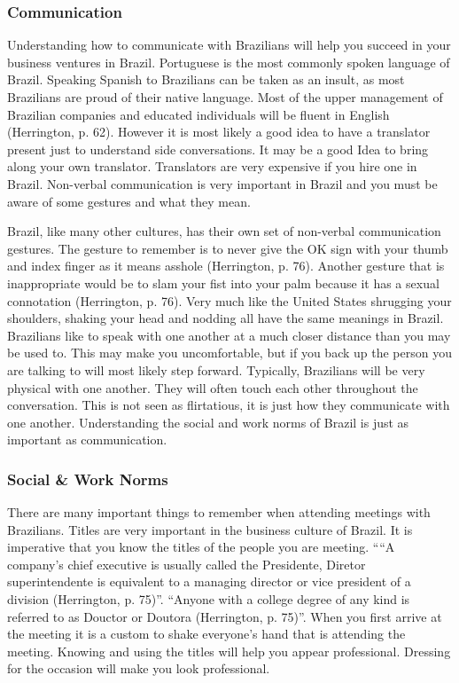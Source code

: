\documentclass[11pt,a4paper,oneside]{report}
\begin{document}
\subsubsection{Communication}\label{third}
Understanding how to communicate with Brazilians will help you succeed in
your business ventures in Brazil. Portuguese is the most commonly spoken
language of Brazil. Speaking Spanish to Brazilians can be taken as an
insult, as most Brazilians are proud of their native language.  Most of the
upper management of Brazilian companies and educated individuals will be
fluent in English (Herrington, p. 62). However it is most likely a good
idea to have a translator present just to understand side conversations. It
may be a good Idea to bring along your own translator. Translators are very
expensive if you hire one in Brazil. Non-verbal communication is very
important in Brazil and you must be aware of some gestures and what they
mean.

Brazil, like many other cultures, has their own set of non-verbal communication
gestures. The gesture to remember is to never give the OK sign with your thumb
and index finger as it means asshole (Herrington, p. 76). Another gesture that
is inappropriate would be to slam your fist into your palm because it has a
sexual connotation (Herrington, p. 76). Very much like the United States
shrugging your shoulders, shaking your head and nodding all have the same
meanings in Brazil.  Brazilians like to speak with one another at a much closer
distance than you may be used to. This may make you uncomfortable, but if you
back up the person you are talking to will most likely step forward. Typically,
Brazilians will be very physical with one another. They will often touch each
other throughout the conversation. This is not seen as flirtatious, it is just
how they communicate with one another. Understanding the social and work norms
of Brazil is just as important as communication.

\subsubsection{Social \& Work Norms}\label{third}
There are many important things to remember when attending meetings with
Brazilians. Titles are very important in the business culture of Brazil. It
is imperative that you know the titles of the people you are meeting. ““A
company’s chief executive is usually called the Presidente, Diretor
superintendente is equivalent to a managing director or vice president of a
division (Herrington, p. 75)”.  “Anyone with a college degree of any kind
is referred to as Douctor or Doutora (Herrington, p. 75)”. When you first
arrive at the meeting it is a custom to shake everyone’s hand that is
attending the meeting. Knowing and using the titles will help you appear
professional. Dressing for the occasion will make you look professional.
\end{document}

